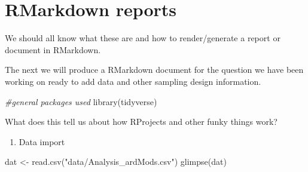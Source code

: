 \documentclass[
]{book}
\newenvironment{Shaded}{\begin{snugshade}}{\end{snugshade}}
\newcommand{\CommentTok}[1]{\textcolor[rgb]{0.56,0.35,0.01}{\textit{#1}}}
\newcommand{\FunctionTok}[1]{\textcolor[rgb]{0.00,0.00,0.00}{#1}}
\newcommand{\NormalTok}[1]{#1}
\newcommand{\OtherTok}[1]{\textcolor[rgb]{0.56,0.35,0.01}{#1}}
\newcommand{\StringTok}[1]{\textcolor[rgb]{0.31,0.60,0.02}{#1}}
\providecommand{\tightlist}{%
  \setlength{\itemsep}{0pt}\setlength{\parskip}{0pt}}
\begin{document}
\hypertarget{rmarkdown-reports}{%
\chapter{RMarkdown reports}\label{rmarkdown-reports}}

We should all know what these are and how to render/generate a report or document in RMarkdown.

The next we will produce a RMarkdown document for the question we have been working on ready to add data and other sampling design information.

\begin{Shaded}
\begin{Highlighting}[]
\CommentTok{\#general packages used}
\FunctionTok{library}\NormalTok{(tidyverse)}
\end{Highlighting}
\end{Shaded}

What does this tell us about how RProjects and other funky things work?

\begin{enumerate}
\def\labelenumi{\arabic{enumi}.}
\setcounter{enumi}{2}
\tightlist
\item
  Data import
\end{enumerate}

\begin{Shaded}
\begin{Highlighting}[]
\NormalTok{dat }\OtherTok{\textless{}{-}} \FunctionTok{read.csv}\NormalTok{(}\StringTok{"data/Analysis\_ardMods.csv"}\NormalTok{)}
\FunctionTok{glimpse}\NormalTok{(dat)}
\end{Highlighting}
\end{Shaded}
\end{document}

